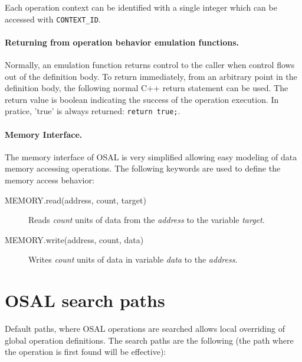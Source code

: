 \documentclass[twoside]{tceusermanual}
\begin{document}
Each operation context can be identified with a single integer which
can be accessed with \verb#CONTEXT_ID#.

\paragraph{Returning from operation behavior emulation functions.}
Normally, an emulation function returns control to the caller when control
flows out of the definition body.  To return immediately, from an arbitrary
point in the definition body, the following normal C++ return 
statement can be used. The return value is boolean indicating the success
of the operation execution. In pratice, 'true' is always returned:
\verb|return true;|.

\paragraph{Memory Interface.}

The memory interface of OSAL is very simplified allowing easy modeling of
data memory accessing operations. The following keywords are used
to define the memory access behavior:

\begin{description}
\item[MEMORY.read(address, count, target)]%
  Reads \emph{count} units of data from the \emph{address} to the variable
  \emph{target}.
\item[MEMORY.write(address, count, data)]%
  Writes \emph{count} units of data in variable \emph{data} to 
  the \emph{address}.
\end{description}

\section{OSAL search paths}
\label{sec:osalpaths}

Default paths, where OSAL operations are searched allows local overriding of 
global operation definitions. The search paths are the following (the path
where the operation is first found will be effective):\\
\end{document}
